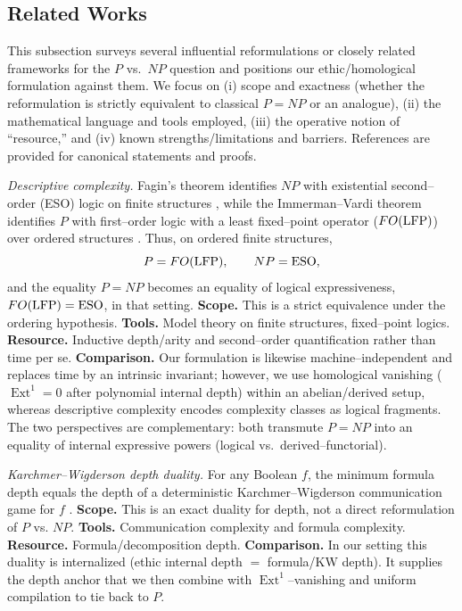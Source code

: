 \documentclass[12pt]{article}
\newcommand{\Ext}{\operatorname{Ext}}
\theoremstyle{plain}
\theoremstyle{definition}
\theoremstyle{remark}
\numberwithin{equation}{section}
\begin{document}
\subsection*{Related Works}

This subsection surveys several influential reformulations or closely related frameworks for the $P$ vs.\ $NP$ question and positions our ethic/homological formulation against them. We focus on (i) scope and exactness (whether the reformulation is strictly equivalent to classical $P{=}NP$ or an analogue), (ii) the mathematical language and tools employed, (iii) the operative notion of ``resource,'' and (iv) known strengths/limitations and barriers. References are provided for canonical statements and proofs.

\emph{Descriptive complexity.} Fagin's theorem identifies $NP$ with existential second–order (ESO) logic on finite structures \cite{Fagin1974}, while the Immerman–Vardi theorem identifies $P$ with first–order logic with a least fixed–point operator ($FO({\rm LFP})$) over ordered structures \cite{Vardi1982,Immerman1986,Immerman1999}. Thus, on ordered finite structures,
\[
P = FO({\rm LFP}), \qquad NP = \mathrm{ESO},
\]
and the equality $P{=}NP$ becomes an equality of logical expressiveness, $FO({\rm LFP})=\mathrm{ESO}$, in that setting. \textbf{Scope.} This is a strict equivalence under the ordering hypothesis. \textbf{Tools.} Model theory on finite structures, fixed–point logics. \textbf{Resource.} Inductive depth/arity and second–order quantification rather than time per se. \textbf{Comparison.} Our formulation is likewise machine–independent and replaces time by an intrinsic invariant; however, we use homological vanishing ($\Ext^1=0$ after polynomial internal depth) within an abelian/derived setup, whereas descriptive complexity encodes complexity classes as logical fragments. The two perspectives are complementary: both transmute $P{=}NP$ into an equality of internal expressive powers (logical vs.\ derived–functorial).

\emph{Karchmer–Wigderson depth duality.} For any Boolean $f$, the minimum formula depth equals the depth of a deterministic Karchmer–Wigderson communication game for $f$ \cite{KarchmerWigderson1990}. \textbf{Scope.} This is an exact duality for depth, not a direct reformulation of $P$ vs. $NP$. \textbf{Tools.} Communication complexity and formula complexity. \textbf{Resource.} Formula/decomposition depth. \textbf{Comparison.} In our setting this duality is internalized (ethic internal depth $=$ formula/KW depth). It supplies the depth anchor that we then combine with $\Ext^1$–vanishing and uniform compilation to tie back to $P$.
\end{document}
